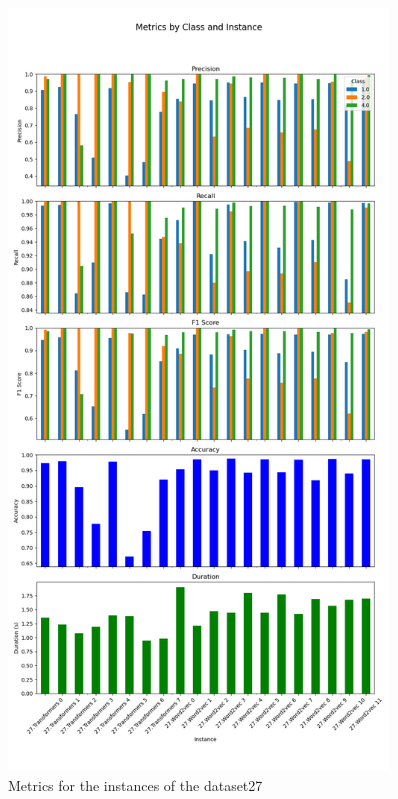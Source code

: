 \begin{figure}[h!]
\centering
\includegraphics[width=0.9\textwidth]{img/annexes/27/27 - Metrics.png}
\caption{Metrics for the instances of the dataset27}
\label{fig:27_metrics_instance}
\end{figure}

